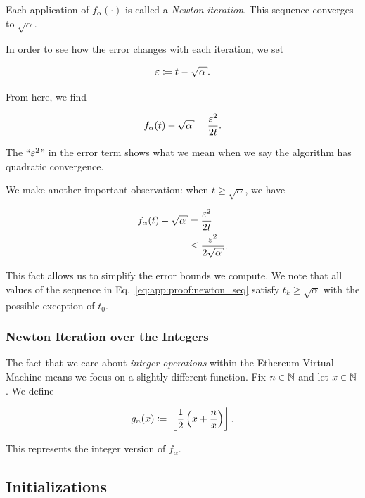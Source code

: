 \noindent
Each application of $f_{\alpha}(\cdot)$ is called a \emph{Newton iteration}.
This sequence converges to $\sqrt{\alpha}$.

In order to see how the error changes with each iteration,
we set

\begin{equation}
    \eps \mathDef{} t - \sqrt{\alpha}.
\end{equation}

\noindent
From here, we find

\begin{equation}
    f_{\alpha}(t) - \sqrt{\alpha} = \frac{\eps^{2}}{2t}.
    \label{eq:app:error_equality}
\end{equation}

\noindent
The ``$\varepsilon^{2}$'' in the error term shows what we mean
when we say the algorithm has quadratic convergence.

We make another important observation:
when $t\ge\sqrt{\alpha}$, we have

\begin{align}
    f_{\alpha}(t) - \sqrt{\alpha} &= \frac{\eps^{2}}{2t} \nonumber\\
        &\le \frac{\eps^{2}}{2\sqrt{\alpha}}.
    \label{eq:app:error_inequality}
\end{align}

\noindent
This fact allows us to simplify the error bounds we compute.
We note that all values of the sequence
in Eq.~\eqref{eq:app:proof:newton_seq}
satisfy $t_{k}\ge\sqrt{\alpha}$
with the possible exception of $t_{0}$.

\subsubsection{Newton Iteration over the Integers}

The fact that we care about \emph{integer operations} within
the Ethereum Virtual Machine means we focus on a slightly different function.
Fix $n\in\mathbb{N}$ and let $x\in\mathbb{N}$.
We define

\begin{equation}
    g_{n}(x) \coloneqq{} \left\lfloor \frac{1}{2}\left( x + \frac{n}{x} \right) \right\rfloor.
\end{equation}

\noindent
This represents the integer version of $f_{\alpha}$.


\subsection{Initializations}
\label{app:initializations}

